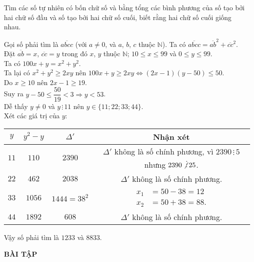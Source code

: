 \begin{vd}
 Tìm các số tự nhiên có bốn chữ số và bằng tổng các bình phương của số tạo bởi hai chữ số đầu và số tạo bởi hai chữ số cuối, biết rằng hai chữ số cuối giống nhau.
 \loigiai
  {
  Gọi số phải tìm là $\overline{abcc}$ (với $a \neq 0$, và $a$, $b$, $c$ thuộc $\mathbb{N}$). Ta có $\overline{abcc} = \overline{ab}^2 + \overline{cc}^2$.\\
  Đặt $\overline{ab} = x$, $\overline{cc} = y$ trong đó $x$, $y$ thuộc $\mathbb{N}$; $10 \leq x \leq 99$ và $0 \leq y \leq 99$.\\
  Ta có $100x + y = x^2 + y^2$.\\
  Ta lại có $x^2 + y^2 \geq 2xy$ nên $100x + y \geq 2xy \Leftrightarrow (2x - 1)(y - 50) \leq 50$.\\
  Do $x \geq 10$ nên $2x - 1 \geq 19$.\\
  Suy ra $y - 50 \leq \dfrac{50}{19} < 3 \Rightarrow y < 53$.\\
  Dễ thấy $y \neq 0$ và $y \, \vdots \, 11$ nên $y \in \{11; 22; 33; 44 \}$.\\
  Xét các giá trị của $y$:
  \begin{center}
  \begin{tabular}{|c|c|c|c|}
  \hline
  $y$  & $y^2 - y$ & $\Delta'$     &  Nhận xét \\
  \hline
  $11$ & $110$     & $2390$        & $\Delta'$ không là số chính phương, vì $2390 \, \vdots \, 5$ nhưng $2390 \not \vdots \, 25$.\\
  \hline
  $22$ & $462$     & $2038$        & $\Delta'$ không là số chính phương.\\
  \hline
  $33$ & $1056$    & $1444 = 38^2$ & $\begin{array}{ll} x_1 & = 50 - 38 = 12 \\ x_2 & = 50 + 38 = 88. \end{array}$ \\
  \hline
  $44$ & $1892$    & $608$         & $\Delta'$ không là số chính phương.\\
  \hline
  \end{tabular}
  \end{center}
  Vậy số phải tìm là $1233$ và $8833$.
  }
\end{vd}



\begin{center}
    \textbf{BÀI TẬP}
\end{center}

